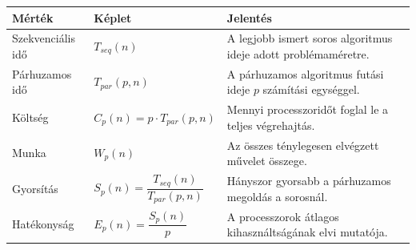 
\begin{tabularx}{\textwidth}{L{34mm}L{42mm}X}
\toprule
\textbf{Mérték} & \textbf{Képlet} & \textbf{Jelentés} \\
\midrule
Szekvenciális idő & $T_{seq}(n)$ & A legjobb ismert soros algoritmus ideje adott problémaméretre. \\
Párhuzamos idő & $T_{par}(p,n)$ & A párhuzamos algoritmus futási ideje $p$ számítási egységgel. \\
Költség & $C_p(n)=p\cdot T_{par}(p,n)$ & Mennyi processzoridőt foglal le a teljes végrehajtás. \\
Munka & $W_p(n)$ & Az összes ténylegesen elvégzett művelet összege. \\
Gyorsítás & $S_p(n)=\dfrac{T_{seq}(n)}{T_{par}(p,n)}$ & Hányszor gyorsabb a párhuzamos megoldás a sorosnál. \\
Hatékonyság & $E_p(n)=\dfrac{S_p(n)}{p}$ & A processzorok átlagos kihasználtságának elvi mutatója. \\
\bottomrule
\end{tabularx}
